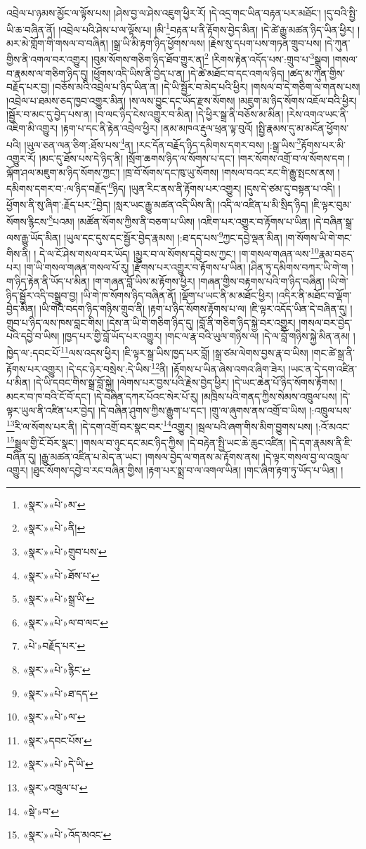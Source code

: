 འབྲེལ་པ་ཉམས་མྱོང་ལ་ལྟོས་པས། །ཤེས་བྱ་ལ་ཤེས་འཇུག་ཕྱིར་རོ། །དེ་འདྲ་གང་ཡིན་བརྟན་པར་མཐོང་། །དུ་བའི་སྤྱི་ཡི་ཆ་བཞིན་ནོ། །འབྲེལ་པའི་ཤེས་པ་ལ་ལྟོས་པ། །མི་\footnote{«སྣར་»«པེ་»མ་}བརྟན་པ་ནི་རྟོགས་བྱེད་མིན། །དེ་ཚེ་རྒྱུ་མཚན་ཉིད་ཡིན་ཕྱིར། །མར་མེ་གློག་གི་གསལ་བ་བཞིན། །སྒྲ་ཡི་མི་རྟག་ཉིད་ཕྱོགས་ལས། །རྗེས་སུ་དཔག་པས་གཏན་གྲུབ་པས། །དེ་ཀུན་གྱིས་ནི་འགལ་བར་འགྱུར། །བུམ་སོགས་གཅིག་ཉིད་ཐོབ་གྱུར་ན།\footnote{«སྣར་»«པེ་»ནི།} །རིགས་རྟེན་འདོད་པས་:གྲུབ་པ་\footnote{«སྣར་»«པེ་»གྲུབ་པས་}སྒྲུབ། །གསལ་བ་རྣམས་ལ་གཅིག་ཉིད་དུ། །ཕྱོགས་འདི་ཡིས་ནི་བྱེད་པ་ན། །དེ་ཚེ་མཐོང་བ་དང་འགལ་ཉིད། །ཚད་མ་ཀུན་གྱིས་བརྗོད་པར་བྱ། །བཅོས་མའི་འབྲེལ་པ་ཉིད་ཡིན་ན། །དེ་ཡི་སྦྱོར་བ་མེད་པའི་ཕྱིར། །གསལ་བ་དེ་གཅིག་ལ་གནས་པས། །འབྲེལ་པ་ཐམས་ཅད་ཁྱབ་འགྱུར་མིན། །ས་ལས་བྱུང་དང་ཡོད་རྫས་སོགས། །མཇུག་མ་ཉིད་སོགས་འཇོལ་བའི་ཕྱིར། །སྦྱོར་བ་མང་དུ་བྱེད་པས་ན། །བ་ལང་ཉིད་ངེས་འགྱུར་བ་མིན། །དེ་ཕྱིར་སྒྲ་ནི་བཅོས་མ་མིན། །རེས་འགའ་ཡང་ནི་འཇིག་མི་འགྱུར། །རྟག་པ་དང་ནི་རྟེན་འབྲེལ་ཕྱིར། །ནམ་མཁའ་རྡུལ་ཕྲན་ལྟ་བུའོ། །སྤྱི་རྣམས་དུ་མ་མངོན་ཕྱོགས་པའི། །ཡུལ་ཅན་ལན་ཅིག་:ཐོས་པས་\footnote{«སྣར་»«པེ་»ཐོས་པ་}ན། །རང་དོན་བརྗོད་ཉིད་དམིགས་དགར་བས། །:སྒྲ་ཡིས་\footnote{«སྣར་»«པེ་»སྒྲ་ཡི་}རྟོགས་པར་མི་འགྱུར་རོ། །མང་དུ་ཐོས་པས་དེ་ཉིད་ནི། །སྲོག་ཆགས་ཉིད་ལ་སོགས་པ་དང་། །གར་སོགས་འགྲོ་བ་ལ་སོགས་དག །ལྐོག་ཤལ་མཇུག་མ་ཉིད་སོགས་ཀྱང་། །ཁྲ་བོ་སོགས་དང་ཁུ་ཡུ་སོགས། །གསལ་བའང་རང་གི་རྒྱུ་སྤངས་ནས། །དམིགས་དགར་བ་:ལ་ཉིད་བརྗོད་\footnote{«སྣར་»«པེ་»ལ་བ་ལང་}ཉིད། །ཡུན་རིང་ནས་ནི་རྟོགས་པར་འགྱུར། །དུས་དེ་ཙམ་དུ་བསྟན་པ་འདི། །ཕྱོགས་ནི་སུ་ཞིག་:རྗོད་པར་\footnote{«པེ་»བརྗོད་པར་}བྱེད། །སླར་ཡང་རྒྱུ་མཚན་འདི་ཡིས་ནི། །འདི་ལ་འཛིན་པ་མི་སྲིད་ཉིད། །ཇི་ལྟར་བུམ་སོགས་རྙིངས་\footnote{«སྣར་»«པེ་»རྙིང་}པའམ། །མཚོན་སོགས་ཀྱིས་ནི་བཅག་པ་ཡིས། །འཇིག་པར་འགྱུར་བ་རྟོགས་པ་ཡིན། །དེ་བཞིན་སྒྲ་ལས་རྒྱུ་ཡོད་མིན། །ཡུལ་དང་དུས་དང་སྦྱོར་བྱེད་རྣམས། །:ཐ་དད་པས་\footnote{«སྣར་»«པེ་»ཐ་དད་}ཀྱང་དབྱེ་ལྡན་མིན། །ག་སོགས་ཡི་གེ་གང་གིས་ནི། །
དེ་ལ་ངོ་ཤེས་གསལ་བར་ཡོད། །མྱུར་བ་ལ་སོགས་དབྱེ་བས་ཀྱང་། །ག་གསལ་གཞན་ལས་\footnote{«སྣར་»«པེ་»ལ་}རྣམ་བཅད་པར། །ག་ཡི་གསལ་གཞན་གསལ་པོ་རུ། །རྫོགས་པར་འགྱུར་བ་རྟོགས་པ་ཡིན། །ཤིན་ཏུ་དམིགས་བཀར་ཡི་གེ་ག །ག་ཉིད་རྟེན་ནི་ཡོད་པ་མིན། །ག་གཞན་བློ་ཡིས་མ་རྟོགས་ཕྱིར། །གཞན་གྱིས་བརྟགས་པའི་ག་ཉིད་བཞིན། །ཡི་གེ་ཉིད་སྦྱོར་འདི་བསྒྲུབ་བྱ། །ཡི་གེ་ཁ་སོགས་ཉིད་བཞིན་ནོ། །ལྡོག་པ་ཡང་ནི་མ་མཐོང་ཕྱིར། །འདིར་ནི་མཐོང་བ་ལྡོག་བྱེད་མིན། །ཡི་གེའི་བདག་ཉིད་གཉིས་གྲུབ་ནི། །རྟག་པ་ཉིད་སོགས་རྟོགས་པ་ལ། །ཇི་ལྟར་འདོད་ཡིན་དེ་བཞིན་དུ། །གྲུབ་པ་ཉིད་ལས་ཁས་བླང་གིས། །དེས་ན་ཡི་གེ་གཅིག་ཉིད་དུ། །བློ་ནི་གཅིག་ཉིད་སྐྱེ་བར་འགྱུར། །གསལ་བར་བྱེད་པའི་དབྱེ་བ་ཡིས། །ཁྱད་པར་གྱི་བློ་ཡོད་པར་འགྱུར། །གང་ལ་རྣ་བའི་ཡུལ་གཉིས་ལ། །དེ་ལ་བློ་གཉིས་སྐྱེ་མིན་ནམ། །ཁྱེད་ལ་:དབང་པོ་\footnote{«སྣར་»དབང་པོས་}ལས་འདས་ཕྱིར། །ཇི་ལྟར་སྒྲ་ཡིས་ཁྱད་པར་བློ། །སྒྲ་ཙམ་ལེགས་བྱས་རྣ་བ་ཡིས། །གང་ཚེ་སྒྲ་ནི་རྟོགས་པར་འགྱུར། །དེ་དང་ཉེར་བསྲེས་:དེ་ཡིས་\footnote{«སྣར་»«པེ་»དེ་ཡི་}ནི། །རྟོགས་པ་ཡིན་ཞེས་འགའ་ཞིག་ཟེར། །ཡང་ན་དེ་དག་འཛིན་པ་མིན། །དེ་ཡི་དབང་གིས་སྒྲ་བློ་སྐྱེ། །ལེགས་པར་བྱས་པའི་རྗེས་བྱེད་ཕྱིར། །དེ་ཡང་ཆེན་པོ་ཉིད་སོགས་རྟོགས། །མངར་བ་ཁ་བའི་ངོ་བོ་དང་། །དེ་བཞིན་དཀར་པོའང་སེར་པོ་རུ། །མཁྲིས་པའི་གནད་ཀྱིས་སེམས་འཁྲུལ་པས། །དེ་ལྟར་ཡུལ་ནི་འཛིན་པར་བྱེད། །དེ་བཞིན་ཤུགས་ཀྱིས་རྒྱུག་པ་དང་། །གྲུ་ལ་ཞུགས་ནས་འགྲོ་བ་ཡིས། །:འཁྲུལ་པས་\footnote{«སྣར་»འཁྲུལ་པ་}རི་ལ་སོགས་པར་ནི། །དེ་དག་འགྲོ་བར་སྣང་བར་\footnote{«སྡེ་»བ་}འགྱུར། །སྦལ་པའི་ཞག་གིས་མིག་བྱུགས་པས། །:འོ་མའང་\footnote{«སྣར་»«པེ་»འོད་མའང་}སྦྲུལ་གྱི་ངོ་བོར་སྣང་། །གསལ་བ་ཉུང་དང་མང་ཉིད་ཀྱིས། །དེ་བརྟེན་སྤྱི་ཡང་ཆེ་ཆུང་འཛིན། །དེ་དག་རྣམས་ནི་ཇི་བཞིན་དུ། །རྒྱུ་མཚན་འཛིན་པ་མེད་ན་ཡང་། །གསལ་བྱེད་ལ་གནས་མ་རྟོགས་ནས། །དེ་ལྟར་གསལ་བྱ་ལ་འཁྲུལ་འགྱུར། །ཐུང་སོགས་དབྱེ་བ་རང་བཞིན་གྱིས། །རྟག་པར་སྨྲ་བ་ལ་འགལ་ཡིན། །གང་ཞིག་རྟག་ཏུ་ཡོད་པ་ཡིན། །
